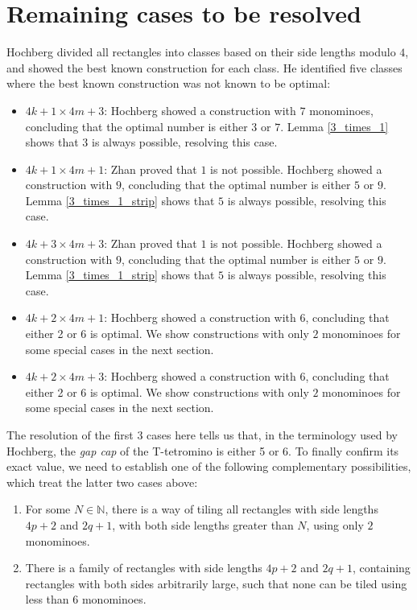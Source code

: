 \documentclass{article}
\theoremstyle{plain}
\begin{document}
\section{Remaining cases to be resolved}
Hochberg divided all rectangles into classes based on their side lengths modulo $4$, and showed the best known construction for each class.
He identified five classes where the best known construction was not known to be optimal:
\begin{itemize}
	\item $4k + 1 \times 4m + 3$: Hochberg showed a construction with $7$ monominoes, concluding that the optimal number is either $3$ or $7$. Lemma \ref{3_times_1} shows that $3$ is always possible, resolving this case.  
	\item $4k + 1 \times 4m + 1$: Zhan proved that $1$ is not possible. Hochberg showed a construction with $9$, concluding that the optimal number is either $5$ or $9$. Lemma \ref{3_times_1_strip} shows that $5$ is always possible, resolving this case.  
	\item $4k + 3 \times 4m + 3$: Zhan proved that $1$ is not possible. Hochberg showed a construction with $9$, concluding that the optimal number is either $5$ or $9$. Lemma \ref{3_times_1_strip} shows that $5$ is always possible, resolving this case.  
	\item $4k + 2 \times 4m + 1$: Hochberg showed a construction with $6$, concluding that either 2 or 6 is optimal. We show constructions with only $2$ monominoes for some special cases in the next section.
	\item $4k + 2 \times 4m + 3$: Hochberg showed a construction with $6$, concluding that either 2 or 6 is optimal. We show constructions with only $2$ monominoes for some special cases in the next section.
\end{itemize}

The resolution of the first 3 cases here tells us that, in the terminology used by Hochberg, the \emph{gap cap} of the T-tetromino is either 5 or 6.
To finally confirm its exact value, we need to establish one of the following complementary possibilities, which treat the latter two cases above:

\begin{enumerate}[label=\textnormal{\Roman*}]
	\item \label{gap_cap_5} For some $N \in \mathbb{N}$, there is a way of tiling all rectangles with side lengths $4p + 2$ and $2q + 1$, with both side lengths greater than $N$, using only $2$ monominoes.
	\item \label{gap_cap_6} There is a family of rectangles with side lengths $4p + 2$ and $2q + 1$, containing rectangles with both sides arbitrarily large, such that none can be tiled using less than $6$ monominoes.
\end{enumerate}
\end{document}
